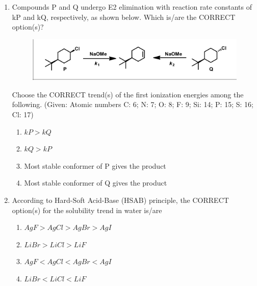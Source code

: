 \documentclass[journal,12pt,onecolumn]{IEEEtran}
\begin{document}
\begin{enumerate}
    \item Compounds P and Q undergo E2 elimination with reaction rate constants of kP and kQ, respectively, as shown below. Which is/are the CORRECT option(s)?\\
    
    \begin{figure}[H]
		\centering
	    \includegraphics[scale=0.5]{23}
		    \caption*{}
		\label{fig:Q23}
	\end{figure}

     Choose the CORRECT trend(s) of the first ionization energies among the following. (Given: Atomic numbers C: 6; N: 7; O: 8; F: 9; Si: 14; P: 15; S: 16; Cl: 17)

    \begin{enumerate}
        \item $kP > kQ$
        \item $kQ > kP$
        \item Most stable conformer of P gives the product
        \item Most stable conformer of Q gives the product
    \end{enumerate}

    \item According to Hard-Soft Acid-Base (HSAB) principle, the CORRECT option(s) for the solubility trend in water is/are
    \begin{enumerate}
        \item $AgF > AgCl > AgBr > AgI$
        \item $LiBr > LiCl > LiF$
        \item $AgF < AgCl < AgBr < AgI$
        \item $LiBr < LiCl < LiF$
    \end{enumerate}


\end{enumerate}
\end{document}
